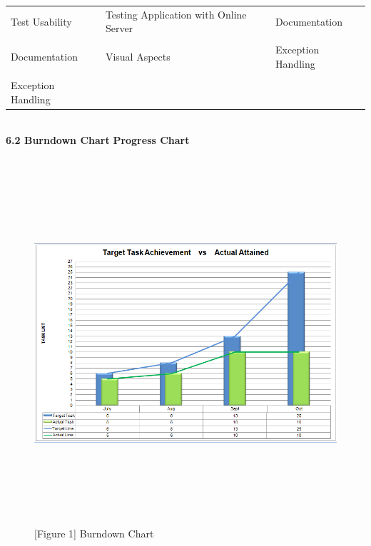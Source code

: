\documentclass[29pt,a4paper]{moderncv}
\begin{document}
\begin{tabular}{| p{7cm} | p{7cm} | p{7cm} |}
   				\\Test Usability & Testing Application with Online Server & Documentation\\
   				
   				\\Documentation & Visual Aspects & Exception Handling\\
   				
   				\\Exception Handling & & \\
   				
 			\end{tabular} \\
\newpage
		\noindent\textbf{6.2 Burndown Chart}
		\noindent\textbf{Progress Chart}
		\begin{figure}
			\centering
			\\ \includegraphics[width=6.0in, height=5.0in]{./chart.png}
			\\\caption{[Figure 1] Burndown Chart}
		\end{figure}\\
		
\end{document}
